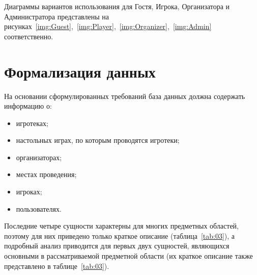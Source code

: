 Диаграммы вариантов использования для Гостя, Игрока, Организатора и
Администратора представлены на
рисунках~\ref{img:Guest},~\ref{img:Player},~\ref{img:Organizer},~\ref{img:Admin}
соответственно.

\clearpage
{}

\section{\label{head:01}Формализация данных}

На основании сформулированных требований база данных должна содержать информацию
о:

\begin{itemize}
    \item игротеках;
    \item настольных играх, по которым проводятся игротеки;
    \item организаторах;
    \item местах проведения;
    \item игроках;
    \item пользователях.
\end{itemize}

Последние четыре сущности характерны для многих предметных областей, поэтому для
них приведено только краткое описание (таблица~\ref{tab:03}), а подробный анализ
приводится для первых двух сущностей, являющихся основными в рассматриваемой
предметной области (их краткое описание также представлено в
таблице~\ref{tab:03}).

